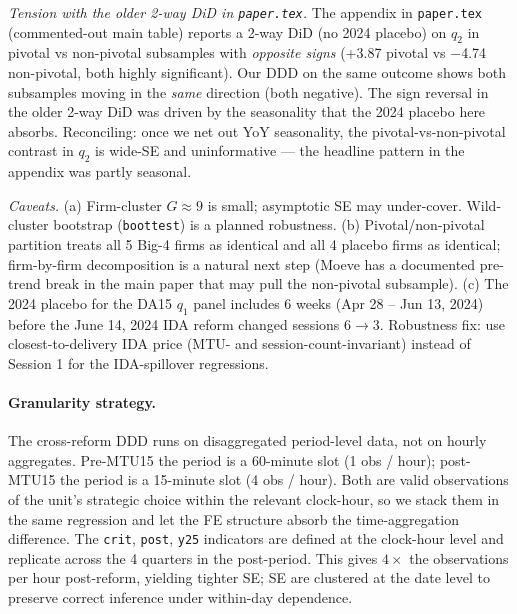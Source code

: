 \documentclass[11pt,a4paper]{article}
\newcommand{\code}[1]{\nolinkurl{#1}}
\begin{document}
\textit{Tension with the older 2-way DiD in \code{paper.tex}.}
The appendix in \code{paper.tex} (commented-out main table) reports a 2-way DiD (no 2024 placebo) on $q_2$ in pivotal vs non-pivotal subsamples with \emph{opposite signs} (+3.87 pivotal vs $-$4.74 non-pivotal, both highly significant). Our DDD on the same outcome shows both subsamples moving in the \emph{same} direction (both negative). The sign reversal in the older 2-way DiD was driven by the seasonality that the 2024 placebo here absorbs. Reconciling: once we net out YoY seasonality, the pivotal-vs-non-pivotal contrast in $q_2$ is wide-SE and uninformative --- the headline pattern in the appendix was partly seasonal.

\textit{Caveats.}
(a) Firm-cluster $G \approx 9$ is small; asymptotic SE may under-cover. Wild-cluster bootstrap (\code{boottest}) is a planned robustness. (b) Pivotal/non-pivotal partition treats all 5 Big-4 firms as identical and all 4 placebo firms as identical; firm-by-firm decomposition is a natural next step (Moeve has a documented pre-trend break in the main paper that may pull the non-pivotal subsample). (c) The 2024 placebo for the DA15 $q_1$ panel includes 6 weeks (Apr 28 -- Jun 13, 2024) before the June 14, 2024 IDA reform changed sessions $6 \to 3$. Robustness fix: use closest-to-delivery IDA price (MTU- and session-count-invariant) instead of Session 1 for the IDA-spillover regressions.






\paragraph{Granularity strategy.}
The cross-reform DDD runs on disaggregated period-level data, not on hourly aggregates. Pre-MTU15 the period is a 60-minute slot (1 obs / hour); post-MTU15 the period is a 15-minute slot (4 obs / hour). Both are valid observations of the unit's strategic choice within the relevant clock-hour, so we stack them in the same regression and let the FE structure absorb the time-aggregation difference. The \code{crit}, \code{post}, \code{y25} indicators are defined at the clock-hour level and replicate across the 4 quarters in the post-period. This gives $4\times$ the observations per hour post-reform, yielding tighter SE; SE are clustered at the date level to preserve correct inference under within-day dependence.
\end{document}
